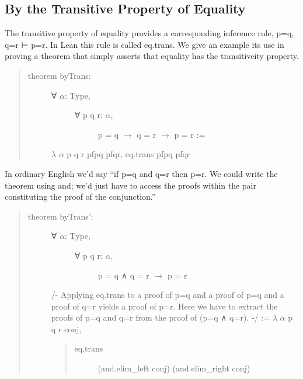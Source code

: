 \documentclass[letterpaper,10pt,english]{sphinxmanual}
\begin{document}
\subsection{By the Transitive Property of Equality}
\label{\detokenize{16-equality:by-the-transitive-property-of-equality}}
The transitive property of equality
provides a corresponding inference
rule, p=q, q=r ⊢ p=r. In Lean this
rule is called eq.trans. We give an
example its use in proving a theorem
that simply asserts that equality
has the transitiveity property.
\begin{quote}
\begin{description}
\item[{theorem byTrans:}] \leavevmode\begin{description}
\item[{∀ \(\alpha\): Type,}] \leavevmode\begin{description}
\item[{∀ p q r: \(\alpha\),}] \leavevmode
p = q \(\rightarrow\) q = r \(\rightarrow\) p = r :=

\end{description}

\end{description}

\(\lambda\) \(\alpha\) p q r pfpq pfqr, eq.trans pfpq pfqr

\end{description}
\end{quote}

In ordinary English we’d say “if p=q and q=r then p=r. We could write
the theorem using and; we’d just have to access the proofs within the
pair constituting the proof of the conjunction.”
\begin{quote}
\begin{description}
\item[{theorem byTrans’:}] \leavevmode\begin{description}
\item[{∀ \(\alpha\): Type,}] \leavevmode\begin{description}
\item[{∀ p q r: \(\alpha\),}] \leavevmode
p = q ∧ q = r \(\rightarrow\) p = r

\end{description}

\end{description}

/-
Applying eq.trans to a proof of p=q and
a proof of p=q and a proof of q=r yields
a proof of p=r. Here we have to extract
the proofs of p=q and q=r from the proof
of (p=q ∧ q=r).
-/
:=  \(\lambda\) \(\alpha\) p q r conj,
\begin{quote}
\begin{description}
\item[{eq.trans}] \leavevmode
(and.elim\_left conj)
(and.elim\_right conj)

\end{description}
\end{quote}

\end{description}
\end{quote}
\end{document}
